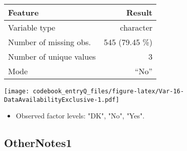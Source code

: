 \documentclass[]{article}
\providecommand{\tightlist}{%
  \setlength{\itemsep}{0pt}\setlength{\parskip}{0pt}}
\newcommand{\fullline}{\noindent\makebox[\linewidth]{\rule{\textwidth}{0.4pt}}}
\newcommand{\bminione}{\begin{minipage}{0.75 \textwidth}}
\newcommand{\bminitwo}{\begin{minipage}{0.25 \textwidth}}
\newcommand{\emini}{\end{minipage}}
\begin{document}
\bminione

\begin{longtable}[]{@{}lr@{}}
\toprule
\begin{minipage}[b]{0.34\columnwidth}\raggedright\strut
Feature\strut
\end{minipage} & \begin{minipage}[b]{0.20\columnwidth}\raggedleft\strut
Result\strut
\end{minipage}\tabularnewline
\midrule
\endhead
\begin{minipage}[t]{0.34\columnwidth}\raggedright\strut
Variable type\strut
\end{minipage} & \begin{minipage}[t]{0.20\columnwidth}\raggedleft\strut
character\strut
\end{minipage}\tabularnewline
\begin{minipage}[t]{0.34\columnwidth}\raggedright\strut
Number of missing obs.\strut
\end{minipage} & \begin{minipage}[t]{0.20\columnwidth}\raggedleft\strut
545 (79.45 \%)\strut
\end{minipage}\tabularnewline
\begin{minipage}[t]{0.34\columnwidth}\raggedright\strut
Number of unique values\strut
\end{minipage} & \begin{minipage}[t]{0.20\columnwidth}\raggedleft\strut
3\strut
\end{minipage}\tabularnewline
\begin{minipage}[t]{0.34\columnwidth}\raggedright\strut
Mode\strut
\end{minipage} & \begin{minipage}[t]{0.20\columnwidth}\raggedleft\strut
``No''\strut
\end{minipage}\tabularnewline
\bottomrule
\end{longtable}

\emini
\bminitwo
\texttt{[image: codebook\_entryQ\_files/figure-latex/Var-16-DataAvailabilityExclusive-1.pdf]}
\emini

\begin{itemize}
\tightlist
\item
  Observed factor levels: "DK", "No", "Yes".
\end{itemize}

\fullline

\hypertarget{othernotes1}{\subsection{OtherNotes1}\label{othernotes1}}
\end{document}
